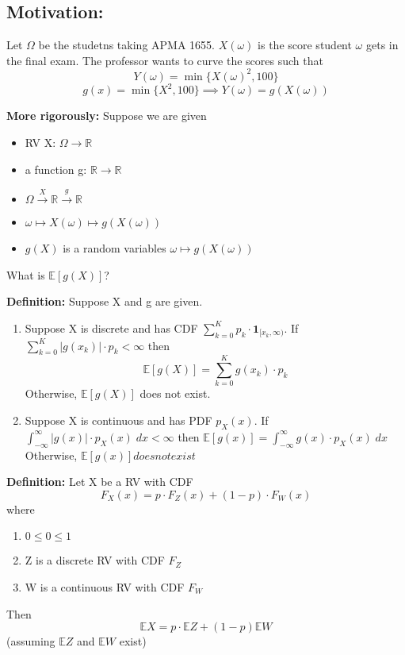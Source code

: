 \documentclass[12pt]{article}
\newcommand{\R}{\mathbb{R}}
\begin{document}
\subsection*{Motivation:}
Let $\Omega$ be the studetns taking APMA 1655.
$X(\omega)$ is the score student $\omega$ gets in the final exam. 
The professor wants to curve the scores such that 
\[Y(\omega) = \min\{X(\omega)^2, 100\}\]
\[g(x) = \min\{X^2, 100\} \implies Y(\omega) = g(X(\omega))\]

\textbf{More rigorously:}
Suppose we are given 
\begin{itemize}
    \item RV X: $\Omega \to \R$
    \item a function g: $\R \to \R$
    \item $\Omega \overset{X}{\to} \R \overset{g}{\to} \R$
    \item $\omega \mapsto X(\omega) \mapsto g(X(\omega))$
    \item $g(X)$ is a random variables $\omega \mapsto g(X(\omega))$
\end{itemize}
What is $\mathbb{E}[g(X)]$?

\textbf{Definition:} Suppose X and g are given.
\begin{enumerate}
    \item Suppose X is discrete and has CDF $\sum_{k=0}^K p_k \cdot \mathbf{1}_{[x_k, \infty)}$.
    If $\sum_{k=0}^K |g(x_k)| \cdot p_k < \infty$ then 
    \[\mathbb{E}[g(X)] = \sum_{k=0}^K g(x_k) \cdot p_k\]
    Otherwise, $\mathbb{E}[g(X)]$ does not exist.

    \item Suppose X is continuous and has PDF $p_X(x)$.
    If $\int_{-\infty}^{\infty} |g(x)| \cdot p_X(x) \; dx < \infty$ then $\mathbb{E}[g(x)] = \int_{-\infty}^{\infty} g(x) \cdot p_X(x) \; dx$
    Otherwise, $\mathbb{E}[g(x)] does not exist$
\end{enumerate}

\textbf{Definition:} Let X be a RV with CDF 
\[F_X(x) = p \cdot F_Z(x) + (1-p )\cdot F_W(x)\]
where 
\begin{enumerate}
    \item $0 \leq 0 \leq 1$
    \item Z is a discrete RV with CDF $F_Z$
    \item W is a continuous RV with CDF $F_W$
\end{enumerate}
Then
\[\mathbb{E}X = p \cdot \mathbb{E}Z + (1 - p)\mathbb{E}W\] 
(assuming $\mathbb{E}Z$ and $\mathbb{E}W$ exist)
\end{document}
